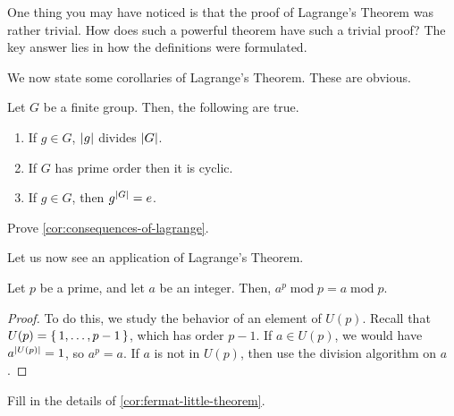 \documentclass[./main.tex]{subfiles}
\begin{document}
One thing you may have noticed is that the proof of Lagrange's Theorem was
rather trivial. How does such a powerful theorem have such a trivial proof? 
The key answer lies in how the definitions were formulated.

We now state some corollaries of Lagrange's Theorem. These are obvious.

\begin{corollary}
\label{cor:consequences-of-lagrange}
    Let $G$ be a finite group. Then, the following are true.
    \begin{enumerate}
        \item If $g \in G$, $\abs{g}$ divides $\abs{G}$.
        \item If $G$ has prime order then it is cyclic.
        \item If $g \in G$, then $g^{\abs G} = e$.
    \end{enumerate}
\end{corollary}
\begin{exercise}
    Prove \cref{cor:consequences-of-lagrange}.
\end{exercise}

Let us now see an application of Lagrange's Theorem.

\begin{corollary}
\label{cor:fermat-little-theorem}
    Let $p$ be a prime, and let $a$ be an integer. Then, $a^p \operatorname{mod}
    p = a \operatorname{mod} p$.  
\end{corollary}
\begin{proof}
    To do this, we study the behavior of an element of $U(p)$. Recall that $U(p)
    = \set{1, \dots, p-1}$, which has order $p-1$. If $a \in U(p)$, we would
    have $a^{\abs{U(p)}} = 1$, so $a^p = a$. If $a$ is not in $U(p)$, then use
    the division algorithm on $a$.
\end{proof}
\begin{exercise}
    Fill in the details of \cref{cor:fermat-little-theorem}.
\end{exercise}
\end{document}
